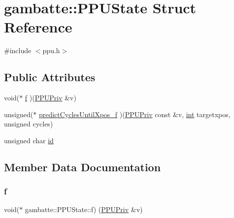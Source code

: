 \hypertarget{structgambatte_1_1PPUState}{}\section{gambatte\+:\+:P\+P\+U\+State Struct Reference}
\label{structgambatte_1_1PPUState}


{\ttfamily \#include $<$ppu.\+h$>$}

\subsection*{Public Attributes}
\begin{DoxyCompactItemize}
\item 
void($\ast$ \hyperlink{structgambatte_1_1PPUState_a995de491176aba32c43617e4f255d57b}{f} )(\hyperlink{structgambatte_1_1PPUPriv}{P\+P\+U\+Priv} \&v)
\item 
unsigned($\ast$ \hyperlink{structgambatte_1_1PPUState_a6eb2480038e1ff8e9e1ee59d1486ade9}{predict\+Cycles\+Until\+Xpos\+\_\+f} )(\hyperlink{structgambatte_1_1PPUPriv}{P\+P\+U\+Priv} const \&v, \hyperlink{ioapi_8h_a787fa3cf048117ba7123753c1e74fcd6}{int} targetxpos, unsigned cycles)
\item 
unsigned char \hyperlink{structgambatte_1_1PPUState_a5365ffcae4c4cec4178cae3c014d561b}{id}
\end{DoxyCompactItemize}


\subsection{Member Data Documentation}
\mbox{\label{structgambatte_1_1PPUState_a995de491176aba32c43617e4f255d57b}} 
\subsubsection{\texorpdfstring{f}{f}}
{\footnotesize\ttfamily void($\ast$ gambatte\+::\+P\+P\+U\+State\+::f) (\hyperlink{structgambatte_1_1PPUPriv}{P\+P\+U\+Priv} \&v)}

\mbox{\label{structgambatte_1_1PPUState_a5365ffcae4c4cec4178cae3c014d561b}} 
